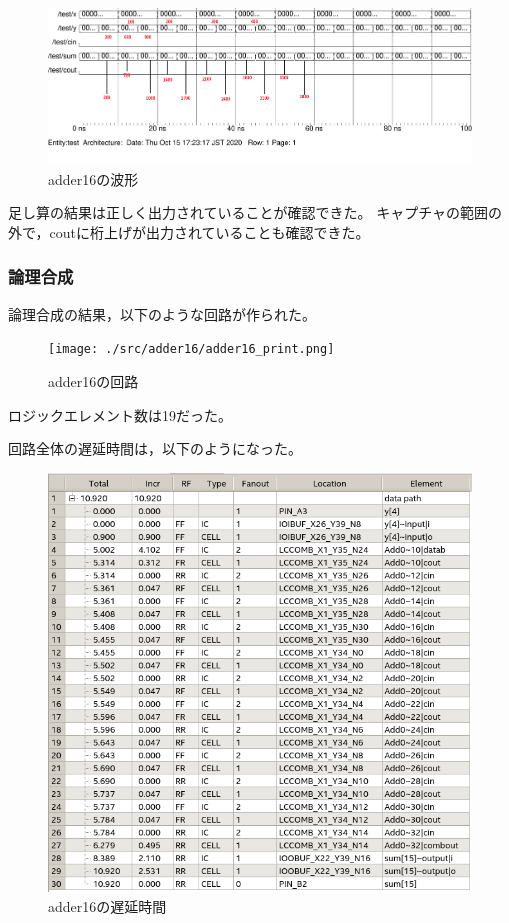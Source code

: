 \begin{figure}[H]
  \centering
  \includegraphics[width=\linewidth]{./src/adder16/adder16_wave21.png}
  \caption{adder16の波形}
\end{figure}

足し算の結果は正しく出力されていることが確認できた。
キャプチャの範囲の外で，coutに桁上げが出力されていることも確認できた。

\subsubsection{論理合成}
論理合成の結果，以下のような回路が作られた。

\begin{figure}[H]
  \centering
  \texttt{[image: ./src/adder16/adder16\_print.png]}
  \caption{adder16の回路}
\end{figure}

ロジックエレメント数は19だった。

回路全体の遅延時間は，以下のようになった。

\begin{figure}[H]
  \centering
  \includegraphics[width=\linewidth]{./src/adder16/adder16Timing.png}
  \caption{adder16の遅延時間}
  \label{adder16の遅延時間}
\end{figure}

